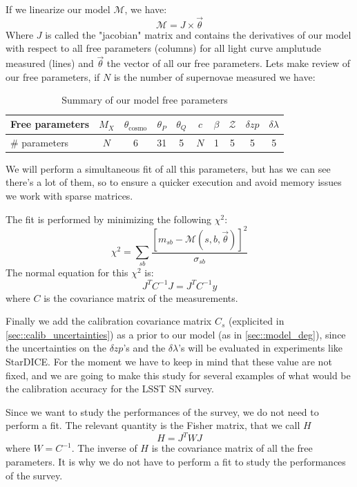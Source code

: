 \documentclass[\docopts]{\docclass}
\begin{document}
If we linearize our model $\mathcal{M}$, we have:
\begin{equation}
\mathcal{M} = J \times \vec\theta
\end{equation}
Where $J$ is called the "jacobian" matrix and contains the derivatives of our model with respect to all free parameters (columns) for all light curve amplutude measured (lines) and $\vec\theta$ the vector of all our free parameters.
Lets make review of our free parameters, if $N$ is the number of supernovae measured we have:

\begin{table}[t]
\begin{center}
\caption{Summary of our model free parameters}
\begin{tabular}{l|ccccccccc}
\hline
\hline
Free parameters & $M_X$ & $\theta_\text{cosmo}$ & $\theta_P$ & $\theta_Q$ & $c$ & $\beta$ & $\mathcal{Z}$ & $\delta zp$ & $\delta \lambda$ \\
\hline
\# parameters & $N$ & 6 & 31 & 5 & $N$ & 1 & 5 & 5 & 5 \\
\hline
\end{tabular}
\end{center}
\end{table}


We will perform a simultaneous fit of all this parameters, but has we can see there's a lot of them, so to ensure a quicker execution and avoid memory issues we work with sparse matrices.

The fit is performed by minimizing the following $\chi^2$:
\begin{equation}
\chi^2 = \sum_{sb}\frac{[m_{sb} - \mathcal{M}(s, b, \vec\theta)]^2}{\sigma_{sb}}
\end{equation}
The normal equation for this $\chi^2$ is:
\begin{equation}
J^TC^{-1}J = J^TC^{-1}y
\end{equation}
where $C$ is the covariance matrix of the measurements.

Finally we add the calibration covariance matrix $C_s$ (explicited in \ref{sec::calib_uncertainties}) as a prior to our model (as in \ref{sec::model_deg}), since the uncertainties on the $\delta zp$'s and the $\delta \lambda$'s will be evaluated in experiments like StarDICE. For the moment we have to keep in mind that these value are not fixed, and we are going to make this study for several examples of what would be the calibration accuracy for the LSST SN survey.

Since we want to study the performances of the survey, we do not need to perform a fit.
The relevant quantity is the Fisher matrix, that we call $H$
\begin{equation}
H = J^TWJ
\end{equation}
where $W = C^{-1}$.
The inverse of $H$ is the covariance matrix of all the free parameters. It is why we do not have to perform a fit to study the performances of the survey.
\end{document}
